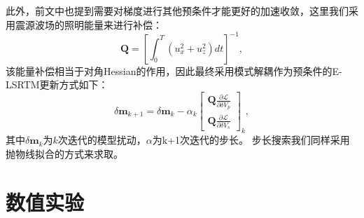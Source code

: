 此外，前文中也提到需要对梯度进行其他预条件才能更好的加速收敛，这里我们采用震源波场的照明能量来进行补偿：
\begin{equation}
	\mathbf{Q} =\left[\int^T_0(u^2_x+u^2_z)dt\right]^{-1},
    \label{eq:Gradient_Illumination_LSRTM}
\end{equation}
该能量补偿相当于对角Hessian的作用，因此最终采用模式解耦作为预条件的E-LSRTM更新方式如下：
\begin{equation}
        \delta\mathbf{m}_{k+1}=\delta\mathbf{m}_{k}-\alpha_k
        \begin{bmatrix}\mathbf{Q}{\frac{\partial\mathcal{L}}{\partial \delta V_p}}\\
		\mathbf{Q}{\frac{\partial\mathcal{L}}{\partial \delta V_s}}\end{bmatrix}_{k},
        \label{eq:Gradientmethod}
\end{equation}
其中$\delta\mathbf{m}_{k}$为$k$次迭代的模型扰动，$\alpha$为k+1次迭代的步长。
步长搜索我们同样采用抛物线拟合的方式来求取。
\section{数值实验}
